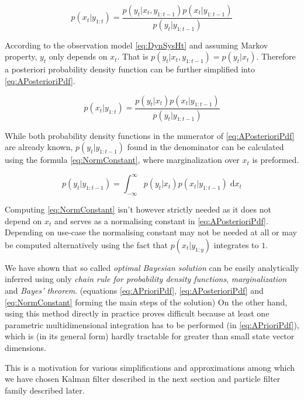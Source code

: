 \documentclass[a4paper,12pt,oneside]{report}
\newcommand{\pdf}{probability density function}
\newcommand{\pdfs}{probability density functions}
\begin{document}
\begin{equation} \label{eq:APosterioriPdfRaw}
	p(x_t | y_{1:t}) = \frac{p(y_t | x_t, y_{1:t-1}) p(x_t | y_{1:t-1})}{p(y_t | y_{1:t-1})}
\end{equation}

According to the observation model \eqref{eq:DynSysHt} and assuming Markov property, \(y_t\) only
depends on \(x_t\). That is \(p(y_t | x_t, y_{1:t-1}) = p(y_t | x_t)\). Therefore a posteriori
{\pdf} can be further simplified into \eqref{eq:APosterioriPdf}.

\begin{equation} \label{eq:APosterioriPdf}
	p(x_t | y_{1:t}) = \frac{p(y_t | x_t) p(x_t | y_{1:t-1})}{p(y_t | y_{1:t-1})}
\end{equation}

While both {\pdfs} in the numerator of \eqref{eq:APosterioriPdf} are already known, \(p(y_t|y_{1:t-1})\)
found in the denominator can be calculated using the formula \eqref{eq:NormConstant}, where
marginalization over \(x_t\) is preformed.

\begin{equation} \label{eq:NormConstant}
	p(y_t | y_{1:t-1}) = \int_{-\infty}^{\infty} p(y_t | x_t) p(x_t | y_{1:t-1}) \; \mathrm{d} x_{t}
\end{equation}

Computing \eqref{eq:NormConstant} isn't however strictly needed as it does not depend on \(x_t\) and
serves as a normalising constant in \eqref{eq:APosterioriPdf}. Depending on use-case the normalising
constant may not be needed at all or may be computed alternatively using the fact that \(p(x_t | y_{1:y})\)
integrates to \(1\).

We have shown that so called \emph{optimal Bayesian solution}\cite{AruMasGor:02} can be easily
analytically inferred using only \emph{chain rule for {\pdfs}}, \emph{marginalization} and
\emph{Bayes' theorem}. (equations \eqref{eq:APrioriPdf}, \eqref{eq:APosterioriPdf} and
\eqref{eq:NormConstant} forming the main steps of the solution) On the other hand, using this
method directly in practice proves difficult because at least one parametric multidimensional
integration has to be performed (in \eqref{eq:APrioriPdf}), which is (in its general form) hardly
tractable for greater than small state vector dimensions.

This is a motivation for various simplifications and approximations among which we have chosen
Kalman filter described in the next section and particle filter family described later.
\end{document}
